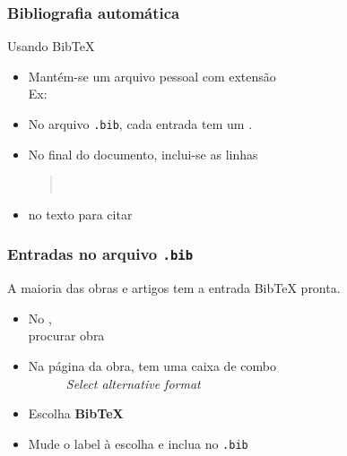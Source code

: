 \begin{frame}
  \frametitle{Bibliografia automática}

  \begin{block}{Usando Bib\TeX\ \leftthumbsup}
    \begin{itemize}
    \item Mantém-se um arquivo pessoal com extensão
      \\
      Ex: 
    \item No arquivo \texttt{.bib}, cada entrada tem um .
    \item No final do documento, inclui-se as linhas
      \begin{quote}\upshape
        \ttfamily
        \blue{\string}\\[2mm]
        \blue{\string}
      \end{quote}
    \item \texttt{\blue{\string\cite}} no
      texto para citar
    \end{itemize}
  \end{block}

\end{frame}

\begin{frame}
  \frametitle{Entradas no arquivo \texttt{.bib}}

  \begin{exemplo}
    A maioria das obras e artigos tem a entrada Bib\TeX{} pronta.

    \begin{itemize}
    \item No ,\\
      procurar obra
    \item Na página da obra, tem uma caixa de combo\\
      \ \ \ \ \ \ {\textit{Select alternative format}}
    \item Escolha \textbf{Bib\TeX}
    \item Mude o label à escolha
      e inclua no \texttt{.bib}
    \end{itemize}
  \end{exemplo}
\end{frame}

